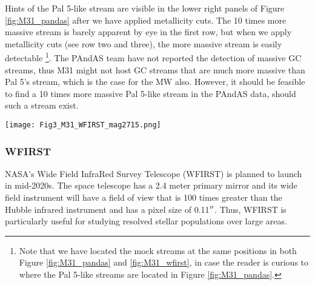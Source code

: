 \documentclass[twocolumn]{aastex62}
\begin{document}
Hints of the Pal 5-like stream are visible in the lower right panels of Figure \ref{fig:M31_pandas} after we have applied metallicity cuts. The 10 times more massive stream is barely apparent by eye in the first row, but when we apply metallicity cuts (see row two and three), the more massive stream is easily detectable \footnote{Note that we have located the mock streams at the same positions in both Figure \ref{fig:M31_pandas} and \ref{fig:M31_wfirst}, in case the reader is curious to where the Pal 5-like streams are located in Figure  \ref{fig:M31_pandas}.}. The PAndAS team have not reported the detection of massive GC streams, thus M31 might not host GC streams that are much more massive than Pal 5's stream, which is the case for the MW also. However, it should be feasible to find a 10 times more massive Pal 5-like stream in the PAndAS data, should such a stream exist.

\begin{figure*}
\centerline{\texttt{[image: Fig3\_M31\_WFIRST\_mag2715.png]}}
\caption{{\bf Cold streams in M31 - with WFIRST}.  This Figure shows the same panels as Figure \ref{fig:M31_pandas}, we have now, however, determine the number of stars in each mock stream by summing up the cumulative number of stars in the streams at the limiting magnitude of WFIRST ($Z068 < 27.15$) at the distance of M31 (see Figure \ref{fig:iso_cfht}, botoom, right panel). Thus, there are 1519 stars in the more massive stream and 148 stars in Pal 5-like stream. At each $R_{GC}$, we have updated the width and lengths of the streams based on the tidal field they experience at these distances (see Section \ref{sec:length}). Additionally, we have updated the number of stars in each field such to illustrate what WFIRST will observe in M31 given WFIRST's  deeper limiting magnitude (see details in Section \ref{sec:WFIRST}).
We note that both the Pal 5-like at the ten times more massive stream are visible in most panels.}
\label{fig:M31_wfirst}
\end{figure*}

\subsubsection{WFIRST}
\label{sec:WFIRST}
NASA's Wide Field InfraRed Survey Telescope (WFIRST) is planned to launch in mid-2020s. The space telescope has a 2.4 meter primary mirror and its wide field instrument will have a field of view that is 100 times greater than the Hubble infrared instrument and has a pixel size of 0.11$\mbox{$^{\prime\prime}$}$. Thus, WFIRST is particularly useful for studying resolved stellar populations over large areas. 
\end{document}
